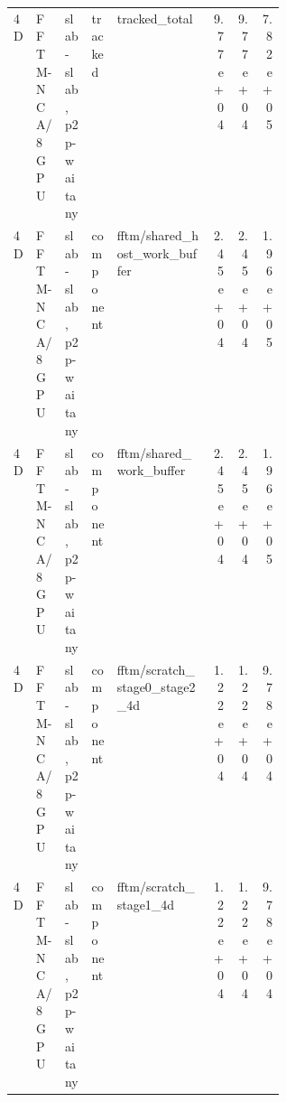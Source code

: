 \documentclass{article}
\begin{document}
\begin{center}
{\begin{tabular}{llll p{0.35\linewidth} rrr}
4D & FFTM-NCA/8GPU & slab-slab, p2p-waitany & tracked & tracked\_total & 9.77e+04 & 9.77e+04 & 7.82e+05 \\
4D & FFTM-NCA/8GPU & slab-slab, p2p-waitany & component & fftm/shared\_host\_work\_buffer & 2.45e+04 & 2.45e+04 & 1.96e+05 \\
4D & FFTM-NCA/8GPU & slab-slab, p2p-waitany & component & fftm/shared\_work\_buffer & 2.45e+04 & 2.45e+04 & 1.96e+05 \\
4D & FFTM-NCA/8GPU & slab-slab, p2p-waitany & component & fftm/scratch\_stage0\_stage2\_4d & 1.22e+04 & 1.22e+04 & 9.78e+04 \\
4D & FFTM-NCA/8GPU & slab-slab, p2p-waitany & component & fftm/scratch\_stage1\_4d & 1.22e+04 & 1.22e+04 & 9.78e+04 \\
\hline
\end{tabular}
}
\end{center}
\end{document}
